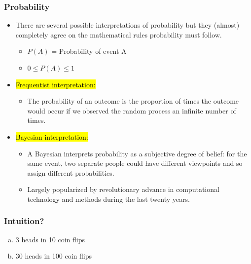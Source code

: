 \begin{frame}
\frametitle{Probability}

\begin{itemize}

\item There are several possible interpretations of probability but they (almost) completely agree on the mathematical rules probability must follow.
\begin{itemize}
\item $P(A)$ = Probability of event A 
\item $0 \le P(A) \le 1$
\end{itemize}

\pause

\item \hl{Frequentist interpretation:} 
\begin{itemize}
\item The probability of an outcome is the proportion of times the outcome would occur if we observed the random process an infinite number of times.
\end{itemize}

\pause

\item \hl{Bayesian interpretation:} 
\begin{itemize}
\item  A Bayesian interprets probability as a subjective degree of belief: for the same event, two separate people could have different viewpoints and so assign different probabilities.
\item Largely popularized by revolutionary advance in computational technology and methods during the last twenty years.
\end{itemize}

\end{itemize}
\end{frame}






\begin{frame}
\frametitle{Intuition?}


\begin{enumerate}[(a)]
\item 3 heads in 10 coin flips
\item 30 heads in 100 coin flips
\end{enumerate}

\end{frame}


